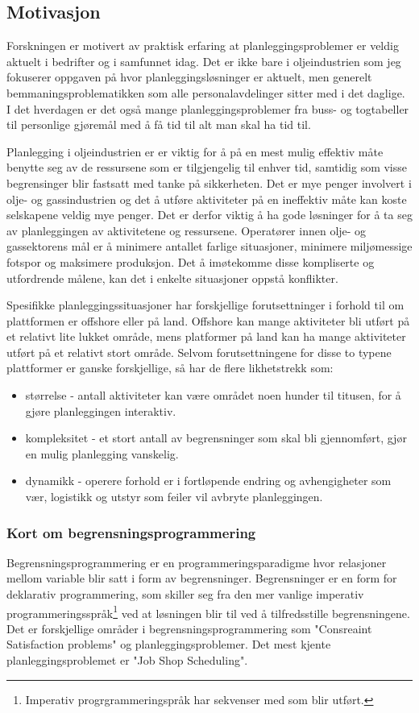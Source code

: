 \subsection{Motivasjon}
Forskningen er motivert av praktisk erfaring at planleggingsproblemer er veldig aktuelt i bedrifter og i samfunnet idag. Det er ikke bare i oljeindustrien som jeg fokuserer oppgaven på hvor planleggingsløsninger er aktuelt, men generelt bemmaningsproblematikken som alle personalavdelinger sitter med i det daglige. I det hverdagen er det også mange planleggingsproblemer fra buss- og togtabeller til personlige gjøremål med å få tid til alt man skal ha tid til.

Planlegging i oljeindustrien er er viktig for å på en mest mulig effektiv måte benytte seg av de ressursene som er tilgjengelig til enhver tid, samtidig som visse begrensinger blir fastsatt med tanke på sikkerheten. Det er mye penger involvert i olje- og gassindustrien og det å utføre aktiviteter på en ineffektiv måte kan koste selskapene veldig mye penger. Det er derfor viktig å ha gode løsninger for å ta seg av planleggingen av aktivitetene og ressursene. Operatører innen olje- og gassektorens mål er å minimere antallet farlige situasjoner, minimere miljømessige fotspor og maksimere produksjon. Det å imøtekomme disse kompliserte og utfordrende målene, kan det i enkelte situasjoner oppstå konflikter.

Spesifikke planleggingssituasjoner har forskjellige forutsettninger i forhold til om plattformen er offshore eller på land. Offshore kan mange aktiviteter bli utført på et relativt lite lukket område, mens platformer på land kan ha mange aktiviteter utført på et relativt stort område. Selvom forutsettningene for disse to typene plattformer er ganske forskjellige, så har de flere likhetstrekk som:
\begin{itemize}
\item størrelse - antall aktiviteter kan være området noen hunder til titusen, for å gjøre planleggingen interaktiv.
\item kompleksitet - et stort antall av begrensninger som skal bli gjennomført, gjør en mulig planlegging vanskelig.
\item dynamikk - operere forhold er i fortløpende endring og avhengigheter som vær, logistikk og utstyr som feiler vil avbryte planleggingen.
\end{itemize}

\subsubsection{Kort om begrensningsprogrammering}
Begrensningsprogrammering er en programmeringsparadigme hvor relasjoner mellom variable blir satt i form av begrensninger. Begrensninger er en form for deklarativ programmering, som skiller seg fra den mer vanlige imperativ programmeringsspråk\footnote{Imperativ progrgrammeringspråk har sekvenser med som blir utført.} ved at løsningen blir til ved å tilfredsstille begrensningene. Det er forskjellige områder i begrensningsprogrammering som "Consreaint Satisfaction problems" og planleggingsproblemer. Det mest kjente planleggingsproblemet er "Job Shop Scheduling".\cite{cpwikipedia}


